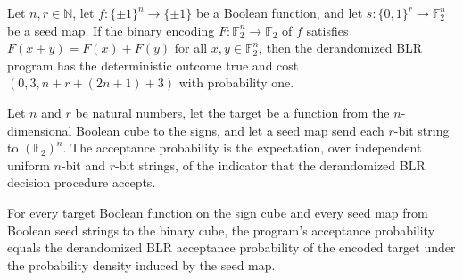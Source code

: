 \begin{theorem}
\leanok
{}
Let $n,r\in\mathbb{N}$, let $f:\{\pm1\}^n\to\{\pm1\}$ be a Boolean function, and let
$s:\{0,1\}^r\to\mathbb{F}_2^n$ be a seed map. If the binary encoding
$F:\mathbb{F}_2^n\to\mathbb{F}_2$ of $f$ satisfies $F(x+y)=F(x)+F(y)$ for all
$x,y\in\mathbb{F}_2^n$, then the derandomized BLR program has the deterministic outcome
true and cost $(0,3,n+r+(2n+1)+3)$ with probability one.
\end{theorem}

\begin{definition}
\label{FABL.derandomizedBLRProgramAcceptanceProbability}
\leanok
{}
Let $n$ and $r$ be natural numbers, let the target be a function from the
$n$-dimensional Boolean cube to the signs, and let a seed map send each $r$-bit string
to $(\mathbb F_2)^n$. The acceptance probability is the expectation, over independent
uniform $n$-bit and $r$-bit strings, of the indicator that the derandomized BLR decision
procedure accepts.
\end{definition}

\begin{theorem}
\label{FABL.derandomizedBLRProgramAcceptanceProbability_eq}
\leanok
{}
For every target Boolean function on the sign cube and every seed map from Boolean seed
strings to the binary cube, the program’s acceptance probability equals the derandomized
BLR acceptance probability of the encoded target under the probability density induced
by the seed map.
\end{theorem}

